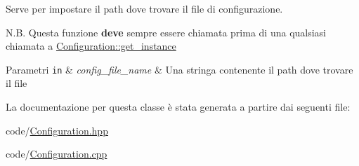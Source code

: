 Serve per impostare il path dove trovare il file di configurazione. 

N.\+B. Questa funzione {\bfseries deve} sempre essere chiamata prima di una qualsiasi chiamata a \mbox{\hyperlink{classmm_1_1_configuration_a5cfc5ea56062f53ef9fbd274f6dbe79e}{Configuration\+::get\+\_\+instance}}


\begin{DoxyParams}[1]{Parametri}
\mbox{\tt in}  & {\em config\+\_\+file\+\_\+name} & Una stringa contenente il path dove trovare il file \\
\hline
\end{DoxyParams}


La documentazione per questa classe è stata generata a partire dai seguenti file\+:\begin{DoxyCompactItemize}
\item 
code/\mbox{\hyperlink{_configuration_8hpp}{Configuration.\+hpp}}\item 
code/\mbox{\hyperlink{_configuration_8cpp}{Configuration.\+cpp}}\end{DoxyCompactItemize}
